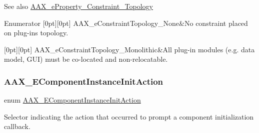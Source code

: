 \begin{DoxySeeAlso}{See also}
\mbox{\hyperlink{a00662_a13e384f22825afd3db6d68395b79ce0da5d7fca796aba48b5dc364af0cc633a02}{A\+A\+X\+\_\+e\+Property\+\_\+\+Constraint\+\_\+\+Topology}} 
\end{DoxySeeAlso}
\begin{DoxyEnumFields}{Enumerator}
[0pt][0pt]{}\mbox{\label{a00491_a714f56a9b0ab98a3a5365760adf77624a2514682fbd713adf583ac9188323dc72}} 
A\+A\+X\+\_\+e\+Constraint\+Topology\+\_\+\+None&No constraint placed on plug-\/in\textquotesingle{}s topology. \\
\hline

[0pt][0pt]{}\mbox{\label{a00491_a714f56a9b0ab98a3a5365760adf77624a5f6fe83329b40c9fd0f70fb7b7377121}} 
A\+A\+X\+\_\+e\+Constraint\+Topology\+\_\+\+Monolithic&All plug-\/in modules (e.\+g. data model, G\+UI) must be co-\/located and non-\/relocatable. \\
\hline

\end{DoxyEnumFields}
\mbox{\label{a00491_aff5646376a3c93f032cf2400e0885023}} 
\subsubsection{\texorpdfstring{AAX\_EComponentInstanceInitAction}{AAX\_EComponentInstanceInitAction}}
{\footnotesize\ttfamily enum \mbox{\hyperlink{a00491_aff5646376a3c93f032cf2400e0885023}{A\+A\+X\+\_\+\+E\+Component\+Instance\+Init\+Action}}}



Selector indicating the action that occurred to prompt a component initialization callback. 

